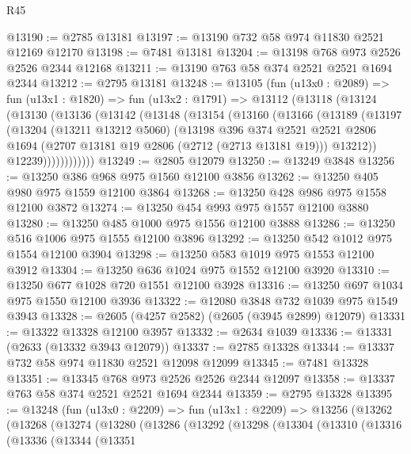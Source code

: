 \begin{lexlean}{R45}
\begin{coremodule}
@13190 := @2785 @13181
@13197 := @13190 @732 @58 @974 @11830 @2521 @12169 @12170
@13198 := @7481 @13181
@13204 := @13198 @768 @973 @2526 @2526 @2344 @12168
@13211 := @13190 @763 @58 @374 @2521 @2521 @1694 @2344
@13212 := @2795 @13181
@13248 := @13105
    (fun (u13x0 : @2089) =>
    fun (u13x1 : @1820) =>
    fun (u13x2 : @1791) =>
    @13112
      (@13118
        (@13124
          (@13130
            (@13136
              (@13142
                (@13148
                  (@13154
                    (@13160
                      (@13166
                        (@13189
                          (@13197
                            (@13204
                              (@13211 @13212 @5060)
                              (@13198
                                @396
                                @374
                                @2521
                                @2521
                                @2806
                                @1694
                                (@2707 @13181 @19 @2806 (@2712 (@2713 @13181 @19)))
                                @13212))
                            @12239))))))))))))
@13249 := @2805 @12079
@13250 := @13249 @3848
@13256 := @13250 @386 @968 @975 @1560 @12100 @3856
@13262 := @13250 @405 @980 @975 @1559 @12100 @3864
@13268 := @13250 @428 @986 @975 @1558 @12100 @3872
@13274 := @13250 @454 @993 @975 @1557 @12100 @3880
@13280 := @13250 @485 @1000 @975 @1556 @12100 @3888
@13286 := @13250 @516 @1006 @975 @1555 @12100 @3896
@13292 := @13250 @542 @1012 @975 @1554 @12100 @3904
@13298 := @13250 @583 @1019 @975 @1553 @12100 @3912
@13304 := @13250 @636 @1024 @975 @1552 @12100 @3920
@13310 := @13250 @677 @1028 @720 @1551 @12100 @3928
@13316 := @13250 @697 @1034 @975 @1550 @12100 @3936
@13322 := @12080 @3848 @732 @1039 @975 @1549 @3943
@13328 := @2605 (@4257 @2582) (@2605 (@3945 @2899) @12079)
@13331 := @13322 @13328 @12100 @3957
@13332 := @2634 @1039
@13336 := @13331 (@2633 (@13332 @3943 @12079))
@13337 := @2785 @13328
@13344 := @13337 @732 @58 @974 @11830 @2521 @12098 @12099
@13345 := @7481 @13328
@13351 := @13345 @768 @973 @2526 @2526 @2344 @12097
@13358 := @13337 @763 @58 @374 @2521 @2521 @1694 @2344
@13359 := @2795 @13328
@13395 := @13248
    (fun (u13x0 : @2209) =>
    fun (u13x1 : @2209) =>
    @13256
      (@13262
        (@13268
          (@13274
            (@13280
              (@13286
                (@13292
                  (@13298
                    (@13304
                      (@13310
                        (@13316
                          (@13336
                            (@13344
                              (@13351

\end{coremodule}
\end{lexlean}
